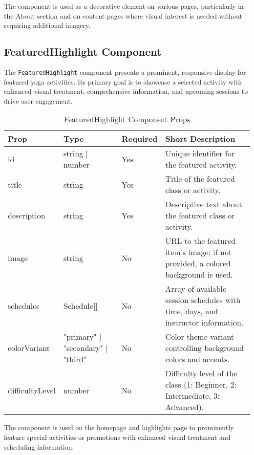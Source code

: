 The component is used as a decorative element on various pages, particularly in the About section and on content pages where visual interest is needed without requiring additional imagery.

\subsection{FeaturedHighlight Component}
The \texttt{FeaturedHighlight} component presents a prominent, responsive display for featured yoga activities. Its primary goal is to showcase a selected activity with enhanced visual treatment, comprehensive information, and upcoming sessions to drive user engagement.

\begin{table}[H]
    \centering
    \setlength{\tabcolsep}{5pt}
    \renewcommand{\arraystretch}{1.2}
    \begin{tabular}{|p{2.2cm}|p{3.6cm}|p{1.5cm}|p{6cm}|}
        \hline
        \rowcolor{bluepoli!20}
        \textbf{Prop} & \textbf{Type} & \textbf{Required} & \textbf{Short Description} \\
        \hline
        id & string | number & Yes & Unique identifier for the featured activity. \\
        \hline
        title & string & Yes & Title of the featured class or activity. \\
        \hline
        description & string & Yes & Descriptive text about the featured class or activity. \\
        \hline
        image & string & No & URL to the featured item's image; if not provided, a colored background is used. \\
        \hline
        schedules & Schedule[] & No & Array of available session schedules with time, days, and instructor information. \\
        \hline
        colorVariant & "primary" | "secondary" | "third" & No & Color theme variant controlling background colors and accents. \\
        \hline
        difficultyLevel & number & No & Difficulty level of the class (1: Beginner, 2: Intermediate, 3: Advanced). \\
        \hline
    \end{tabular}
    \caption{FeaturedHighlight Component Props}
\end{table}

The component is used on the homepage and highlights page to prominently feature special activities or promotions with enhanced visual treatment and scheduling information.

